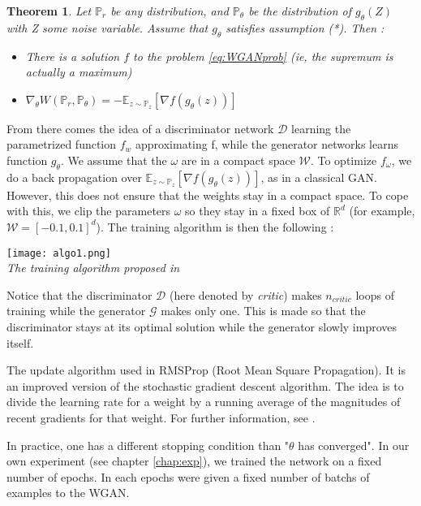 \documentclass[a4paper]{report}
\newcommand{\G}{\mathcal{G}}
\newcommand{\D}{\mathcal{D}}
\newcommand{\W}{\mathcal{W}}
\newcommand{\Expec}{\mathbb{E}}
\newcommand{\Prob}{\mathbb{P}}
\newcommand{\real}{\mathbb{R}}
\theoremstyle{plain}
\newtheorem{thm}{Theorem}
\theoremstyle{remark}
\theoremstyle{definition}
\begin{document}
\begin{thm}
\label{thm:exist_opt}
Let $\Prob_r$ be any distribution, and $\Prob_\theta$ be the distribution of $g_\theta(Z)$ with Z some noise variable. Assume that $g_\theta$ satisfies assumption (*). Then :
\begin{itemize}
\item There is a solution $f$ to the problem \ref{eq:WGANprob} (ie, the supremum is actually a maximum)
\item $\nabla_\theta W(\Prob_r, \Prob_\theta) = - \Expec_{z \sim \Prob_z}[\nabla f(g_\theta(z))]$
\end{itemize}
\end{thm}

From there comes the idea of a discriminator network $\D$ learning the parametrized function $f_w$ approximating f, while the generator networks learns function $g_\theta$. We assume that the $\omega$ are in a compact space $\W$. To optimize $f_\omega$, we do a back propagation over $\Expec_{z \sim \Prob_z}[\nabla f(g_\theta(z))]$, as in a classical GAN.
However, this does not ensure that the weights stay in a compact space. To cope with this, we clip the parameters $\omega$ so they stay in a fixed box of $\real^d$ (for example, $\W = [-0.1,0.1]^d$). The training algorithm is then the following :

\begin{center}
	\texttt{[image: algo1.png]} \\
	\label{alg:1}
    \emph{The training algorithm proposed in \cite{arjovsky2017wasserstein}}
\end{center} 

Notice that the discriminator $\D$ (here denoted by \emph{critic}) makes $n_{critic}$ loops of training while the generator $\G$ makes only one. This is made so that the discriminator stays at its optimal solution while the generator slowly improves itself.

The update algorithm used in RMSProp (Root Mean Square Propagation). It is an improved version of the stochastic gradient descent algorithm. The idea is to divide the learning rate for a weight by a running average of the magnitudes of recent gradients for that weight. For further information, see \cite{tieleman2012lecture}.

In practice, one has a different stopping condition than "$\theta$ has converged". In our own experiment (see chapter \ref{chap:exp}), we trained the network on a fixed number of epochs. In each epochs were given a fixed number of batchs of examples to the WGAN.
\end{document}
